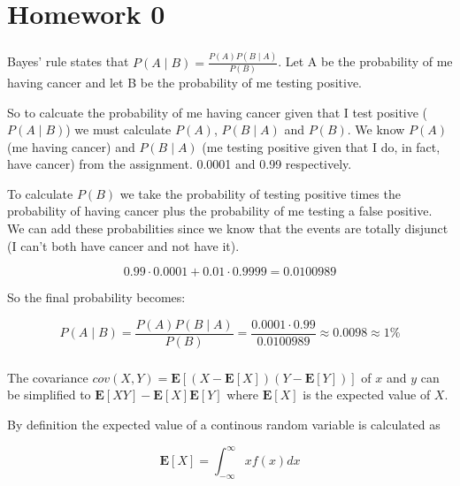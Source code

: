 \documentclass{article}
\begin{document}
\setcounter{section}{1}
\chapter{Homework 0}
\subsection{}

Bayes' rule states that $P(A\mid B) = \frac{P(A)P(B\mid A)}{P(B)}$. Let A be the
probability of me having cancer and let B be the probability of me testing
positive.

So to calcuate the probability of me having cancer given that I test positive
($P(A\mid B)$) we must calculate $P(A)$, $P(B\mid A)$ and $P(B)$.  We know
$P(A)$ (me having cancer) and $P(B\mid A)$ (me testing positive given that I
do, in fact, have cancer) from the assignment. 0.0001 and 0.99 respectively.

To calculate $P(B)$ we take the probability of testing positive times the
probability of having cancer plus the probability of me testing a false
positive. We can add these probabilities since we know that the events are
totally disjunct (I can't both have cancer and not have it).

\begin{equation}
0.99 \cdot 0.0001 + 0.01 \cdot 0.9999 = 0.0100989
\end{equation}

So the final probability becomes:

\begin{equation}
  P(A\mid B) = \frac{P(A)P(B\mid A)}{P(B)} =
  \frac{0.0001 \cdot 0.99}{0.0100989} \approx 0.0098 \approx 1\%
\end{equation}

\subsection{}

The covariance $cov(X,Y) = \mathbf{E}[(X - \mathbf{E}[X])(Y - \mathbf{E}[Y])]$
of $x$ and $y$ can be simplified to $\mathbf{E}[XY] -
\mathbf{E}[X]\mathbf{E}[Y]$ where $\mathbf{E}[X]$ is the expected value of $X$.

By definition the expected value of a continous random variable is calculated as

\begin{equation}
  \label{expvalue}
  \mathbf{E}[X] = \int_{-\infty}^{\infty} x f(x) dx
\end{equation}
\end{document}
